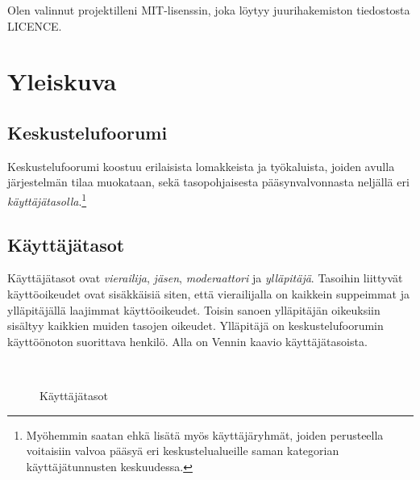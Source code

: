 \documentclass[11pt]{article}
\begin{document}
	Olen valinnut projektilleni MIT-lisenssin, joka löytyy juurihakemiston tiedostosta LICENCE.
\newpage

\section{Yleiskuva}
	\subsection{Keskustelufoorumi}
		Keskustelufoorumi koostuu erilaisista lomakkeista ja työkaluista, joiden avulla järjestelmän tilaa
		muokataan, sekä tasopohjaisesta pääsynvalvonnasta neljällä eri \emph{käyttäjätasolla}.\footnote{
		Myöhemmin saatan ehkä lisätä myös käyttäjäryhmät, joiden perusteella voitaisiin valvoa
		pääsyä eri keskustelualueille saman kategorian käyttäjätunnusten keskuudessa.}
	
	\subsection{Käyttäjätasot}
		Käyttäjätasot ovat \emph{vierailija}, \emph{jäsen}, \emph{moderaattori} ja \emph{ylläpitäjä}.
		Tasoihin liittyvät käyttöoikeudet ovat sisäkkäisiä siten, että vierailijalla on kaikkein suppeimmat
		ja ylläpitäjällä laajimmat käyttöoikeudet. Toisin sanoen ylläpitäjän oikeuksiin sisältyy kaikkien
		muiden tasojen oikeudet. Ylläpitäjä on keskustelufoorumin käyttöönoton suorittava henkilö. Alla on
		Vennin kaavio käyttäjätasoista.
	
		\begin{figure}[H]
			\vspace{1cm}
			\centering
			\\
			\caption{Käyttäjätasot}
		\end{figure}
	
	\newpage
\end{document}
